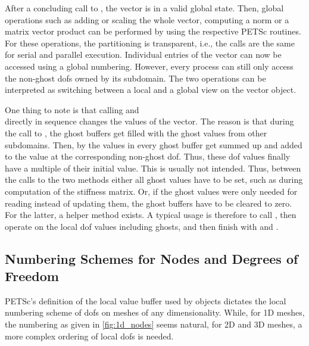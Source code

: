 After a concluding call to , the vector is in a valid global state. Then, global operations such as adding or scaling the whole vector, computing a norm or a matrix vector product can be performed by using the respective PETSc routines. For these operations, the partitioning is transparent, i.e., the calls are the same for serial and parallel execution. Individual entries of the vector can now be accessed using a global numbering. However, every process can still only access the non-ghost dofs owned by its subdomain. The two operations can be interpreted as switching between a local and a global view on the vector object.

One thing to note is that calling  and \\ directly in sequence changes the values of the vector. The reason is that during the call to , the ghost buffers get filled with the ghost values from other subdomains. Then, by  the values in every ghost buffer get summed up and added to the value at the corresponding non-ghost dof. Thus, these dof values finally have a multiple of their initial value.  This is usually not intended. Thus, between the calls to the two methods either all ghost values have to be set, such as during computation of the stiffness matrix. Or, if the ghost values were only needed for reading instead of updating them, the ghost buffers have to be cleared to zero. For the latter, a helper method  exists. A typical usage is therefore to call , then operate on the local dof values including ghosts, and then finish with  and .


\subsection{Numbering Schemes for Nodes and Degrees of Freedom}\label{sec:numbering_schemes_for}

PETSc's definition of the local value buffer used by \Vec{} objects dictates the local numbering scheme of dofs on meshes of any dimensionality. While, for 1D meshes, the numbering as given in \cref{fig:1d_nodes} seems natural, for 2D and 3D meshes, a more complex ordering of local dofs is needed.

